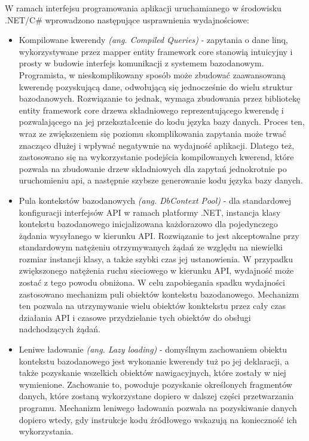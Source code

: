 W ramach interfejsu programowania aplikacji uruchamianego w środowisku .NET/C\# wprowadzono następujące usprawnienia wydajnościowe:
\begin{itemize}
    \item Kompilowane kwerendy \textit{(ang. Compiled Queries)} - zapytania o dane linq, wykorzystywane przez mapper entity framework core stanowią intuicyjny i prosty w budowie interfejs komunikacji z systemem bazodanowym. Programista, w nieskomplikowany sposób może zbudować zaawansowaną kwerendę pozyskującą dane, odwołującą się jednocześnie do wielu struktur bazodanowych. Rozwiązanie to jednak, wymaga zbudowania przez bibliotekę entity framework core drzewa składniowego reprezentującego kwerendę i pozwalającego na jej przekształcenie do kodu języka bazy danych. Proces ten, wraz ze zwiększeniem się poziomu skomplikowania zapytania może trwać znacząco dłużej i wpływać negatywnie na wydajność aplikacji. Dlatego też, zastosowano się na wykorzystanie podejścia kompilowanych kwerend, które pozwala na zbudowanie drzew składniowych dla zapytań jednokrotnie po uruchomieniu api, a następnie szybsze generowanie kodu języka bazy danych.
    \item Pula kontekstów bazodanowych \textit{(ang. DbContext Pool)} - dla standardowej konfiguracji interfejsów API w ramach platformy .NET, instancja klasy kontekstu bazodanowego inicjalizowana każdorazowo dla pojedynczego żądania wysyłanego w kierunku API. Rozwiązanie to jest akceptowalne przy standardowym natężeniu otrzymywanych żądań ze względu na niewielki rozmiar instancji klasy, a także szybki czas jej ustanowienia. W przypadku zwiększonego natężenia ruchu sieciowego w kierunku API, wydajność może zostać z tego powodu obniżona. W celu zapobiegania spadku wydajności zastosowano mechanizm puli obiektów kontekstu bazodanowego. Mechanizm ten pozwala na utrzymywanie wielu obiektów konktekstu przez cały czas działania API i czasowe przydzielanie tych obiektów do obsługi nadchodzących żądań.
    \item Leniwe ładowanie \textit{(ang. Lazy loading)} - domyślnym zachowaniem obiektu kontekstu bazodanowego jest wykonanie kwerendy tuż po jej deklaracji, a także pozyskanie wszelkich obiektów nawigacyjnych, które zostały w niej wymienione. Zachowanie to, powoduje pozyskanie określonych fragmentów danych, które zostaną wykorzystane dopiero w dalszej części przetwarzania programu. Mechanizm leniwego ładowania pozwala na pozyskiwanie danych dopiero wtedy, gdy instrukcje kodu źródłowego wskazują na konieczność ich wykorzystania.

\end{itemize}

